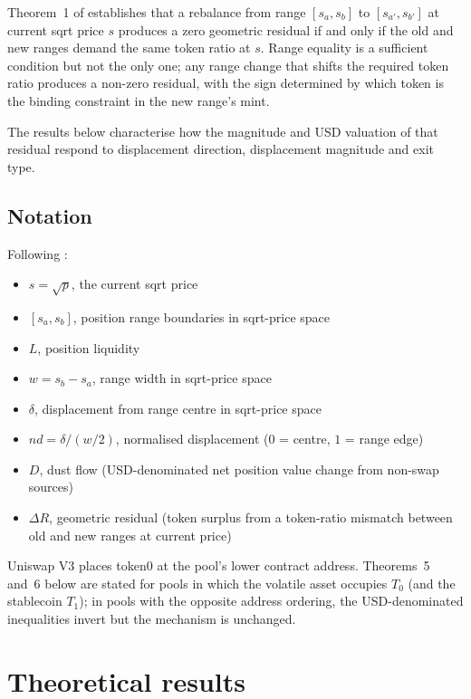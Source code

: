 \documentclass[11pt,a4paper]{article}
\theoremstyle{definition}
\begin{document}
Theorem~1 of \citet{ryan2026a} establishes that a rebalance from range $[s_a, s_b]$ to $[s_{a'}, s_{b'}]$ at current sqrt price $s$ produces a zero geometric residual if and only if the old and new ranges demand the same token ratio at $s$. Range equality is a sufficient condition but not the only one; any range change that shifts the required token ratio produces a non-zero residual, with the sign determined by which token is the binding constraint in the new range's mint.

The results below characterise how the magnitude and USD valuation of that residual respond to displacement direction, displacement magnitude and exit type.

\subsection{Notation}

Following \citet{ryan2026a}:

\begin{itemize}[nosep]
    \item $s = \sqrt{p}$, the current sqrt price
    \item $[s_a, s_b]$, position range boundaries in sqrt-price space
    \item $L$, position liquidity
    \item $w = s_b - s_a$, range width in sqrt-price space
    \item $\delta$, displacement from range centre in sqrt-price space
    \item $nd = \delta / (w/2)$, normalised displacement ($0$ = centre, $1$ = range edge)
    \item $D$, dust flow (USD-denominated net position value change from non-swap sources)
    \item $\Delta R$, geometric residual (token surplus from a token-ratio mismatch between old and new ranges at current price)
\end{itemize}

Uniswap V3 places token0 at the pool's lower contract address. Theorems~5 and~6 below are stated for pools in which the volatile asset occupies $T_0$ (and the stablecoin $T_1$); in pools with the opposite address ordering, the USD-denominated inequalities invert but the mechanism is unchanged.

\section{Theoretical results}
\end{document}
